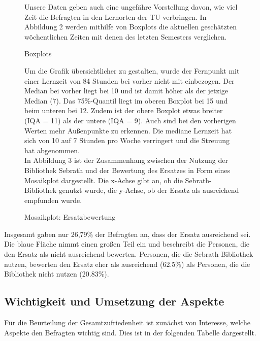 \documentclass[11pt, a4paper]{article}
\begin{document}
\begin{figure}[htp]
	Unsere Daten geben auch eine ungefähre Vorstellung davon, wie viel Zeit die Befragten in den Lernorten der TU verbringen.
	In Abbildung 2 werden mithilfe von Boxplots die aktuellen geschätzten wöchentlichen Zeiten mit denen des letzten Semesters verglichen. \\
	\vspace{-1.5cm}
	\hspace{-0.8cm}
	{\centering} 
	\vspace{0cm}
	\caption{Boxplots}
	\vspace{0.7cm}
	\raggedright
Um die Grafik übersichtlicher zu gestalten, wurde der Fernpunkt mit einer Lernzeit von 84 Stunden bei vorher nicht mit einbezogen.
Der Median bei vorher liegt bei 10 und ist damit höher als der jetzige Median (7).
Das 75\%-Quantil liegt im oberen Boxplot bei 15 und beim unteren bei 12.
Zudem ist der obere Boxplot etwas breiter (IQA = 11) als der untere (IQA = 9).
Auch sind bei den vorherigen Werten mehr Außenpunkte zu erkennen.
Die mediane Lernzeit hat sich von 10 auf 7 Stunden pro Woche verringert und die Streuung hat abgenommen.\\

In Abbildung 3 ist der Zusammenhang zwischen der Nutzung der Bibliothek Sebrath und der Bewertung des Ersatzes in Form eines Mosaikplot dargestellt. Die x-Achse gibt an, ob die Sebrath-Bibliothek genutzt wurde, die y-Achse, ob der Ersatz als ausreichend empfunden wurde. 
	
	\vspace{0.5cm}
	 \begin{center}
	{\centering } \end{center}
	\vspace{-1.5cm}
	\caption{Mosaikplot: Ersatzbewertung}
\end{figure}

\leavevmode
\newpage
Insgesamt gaben nur 26,79\% der Befragten an, dass der Ersatz ausreichend sei. Die blaue Fläche nimmt einen großen Teil ein und beschreibt die Personen, die den Ersatz als nicht ausreichend bewerten. Personen, die die Sebrath-Bibliothek nutzen, bewerten den Ersatz eher als ausreichend (62.5\%) als Personen, die die Bibliothek nicht nutzen (20.83\%).

\subsection{Wichtigkeit und Umsetzung der Aspekte}
Für die Beurteilung der Gesamtzufriedenheit ist zunächst von Interesse, welche Aspekte den Befragten wichtig sind. Dies ist in der folgenden Tabelle dargestellt.
\end{document}

